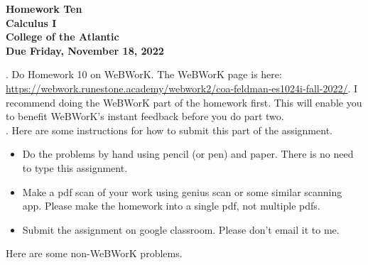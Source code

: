 \documentclass[12pt]{extarticle}
\begin{document}
\pagestyle{empty}
 
\begin{center}
{\LARGE {\bf Homework Ten}}\\
\bigskip
{\Large {\bf Calculus I}}\\
\bigskip
{\Large {\bf College of the Atlantic}}\\
\bigskip
{ {\bf Due Friday, November 18, 2022}}\\ 
\end{center}
\medskip


.  Do Homework 10 on
WeBWorK.  The WeBWorK page is here: 
\url{https://webwork.runestone.academy/webwork2/coa-feldman-es1024i-fall-2022/}.
I recommend doing the WeBWorK part of the homework first.  This will
enable you to benefit WeBWorK's instant feedback before you do part
two.\\ 


.  Here are some
instructions for how to submit this part of the assignment.
\begin{itemize}
  \setlength{\itemsep}{0mm}
\item Do the problems by hand using pencil (or pen) and paper.
  There is no need to type this assignment.
\item Make a pdf scan of your work using genius scan or some
  similar scanning app.  Please make the homework into a single
  pdf, not multiple pdfs.
\item Submit the assignment on google classroom.  Please don't
  email it to me.
\end{itemize}

\noindent Here are some non-WeBWorK problems.
\end{document}
